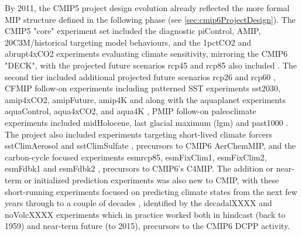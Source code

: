 \documentclass[gmd, preprint]{copernicus}
\newcommand{\mycomment}[1]{}
\begin{document}
By 2011, the CMIP5 project design evolution already reflected the more formal MIP structure defined in the following phase (see \autoref{sec:cmip6ProjectDesign}). The CMIP5 "core" experiment set included the diagnostic piControl, AMIP, 20C3M/historical targeting model behaviours, and the 1pctCO2 and abrupt4xCO2 experiments evaluating climate sensitivity, mirroring the CMIP6 "DECK", with the projected future scenarios rcp45 and rcp85 also included \citep{stouffer_cmip5_2011}. The second tier included additional projected future scenarios rcp26 and rcp60 \citep[precursors to CMIP6 ScenarioMIP experiments;][]{hibbard_primer_2011}, CFMIP follow-on experiments including patterned SST experiments sst2030, amip4xCO2, amipFuture, amip4K and along with the aquaplanet experiments aquaControl, aqua4xCO2, and aqua4K \citep{bony_cfmip_2011}, PMIP follow-on paleoclimate experiments included midHolocene, last glacial maximum (lgm) and past1000 \citep{braconnot_paleoclimate_2011}. The project also included experiments targeting short-lived climate forcers sstClimAerosol and sstClimSulfate \citep{boucher_climate_2011}, precursors to CMIP6 AerChemMIP, and the carbon-cycle focused experiments esmrcp85, esmFixClim1, esmFixClim2, esmFdbk1 and esmFdbk2 \citep{friedlingstein_climate-carbon_2011}, precursors to CMIP6's C4MIP. The addition or near-term or initialized prediction experiments was also new to CMIP, with these short-running experiments focused on predicting climate states from the next few years through to a couple of decades \citep{doblas-reyes_cmip5_2011}, identified by the decadalXXXX and noVolcXXXX experiments which in practice worked both in hindcast (back to 1959) and near-term future (to 2015), precursors to the CMIP6 DCPP activity.

\mycomment{
Map CMIP5 experiments to CMIP6 MIPs
https://github.com/PCMDI/CMIP5_CVs/blob/main/src/writeJson.py
https://docs.google.com/document/d/1bUwK6G_fVZO53UjLZbQUOuBP47PsT8lqKKhL1pjRnKg/edit
}
\end{document}
